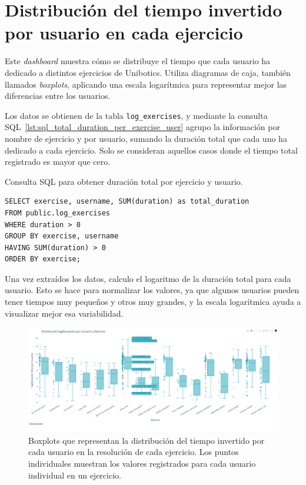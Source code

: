 \documentclass[a4paper, 12pt]{book}
\begin{document}
\section{Distribución del tiempo invertido por usuario en cada ejercicio}
\label{sec:dash3b}

Este \textit{dashboard} muestra cómo se distribuye el tiempo que cada usuario ha dedicado a distintos ejercicios de Unibotics. Utiliza diagramas de caja, también llamados \textit{boxplots}, aplicando una escala logarítmica para representar mejor las diferencias entre los usuarios.

Los datos se obtienen de la tabla \texttt{log\_exercises}, y mediante la consulta SQL~\ref{lst:sql_total_duration_per_exercise_user} agrupo la información por nombre de ejercicio y por usuario, sumando la duración total que cada uno ha dedicado a cada ejercicio. Solo se consideran aquellos casos donde el tiempo total registrado es mayor que cero.

\begin{listing}[h!]
\caption{Consulta SQL para obtener duración total por ejercicio y usuario.}
\label{lst:sql_total_duration_per_exercise_user}
\begin{verbatim}
SELECT exercise, username, SUM(duration) as total_duration
FROM public.log_exercises
WHERE duration > 0
GROUP BY exercise, username
HAVING SUM(duration) > 0
ORDER BY exercise;
\end{verbatim}
\end{listing}

Una vez extraídos los datos, calculo el logaritmo de la duración total para cada usuario. Esto se hace para normalizar los valores, ya que algunos usuarios pueden tener tiempos muy pequeños y otros muy grandes, y la escala logarítmica ayuda a visualizar mejor esa variabilidad.

\begin{figure}[H]
  \centering
  \includegraphics[width=1.1\textwidth]{img/3bb.png}
  \caption{Boxplots que representan la distribución del tiempo invertido por cada usuario en la resolución de cada ejercicio. Los puntos individuales muestran los valores registrados para cada usuario individual en un ejercicio.}
  \label{fig:3b}
\end{figure}
\end{document}
